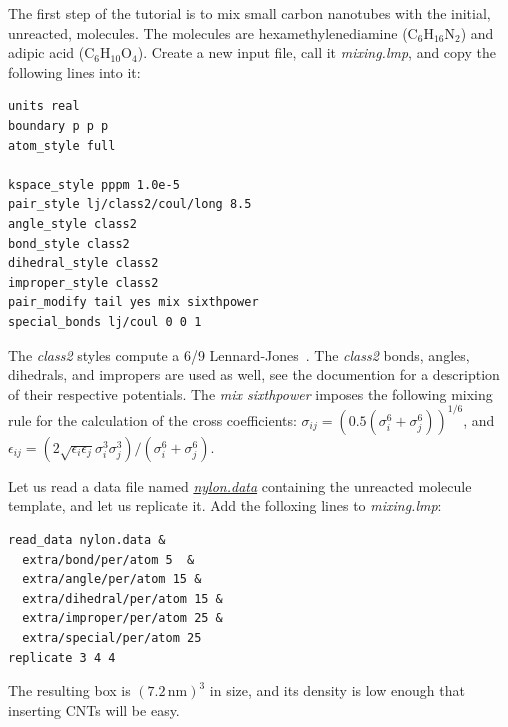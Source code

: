 \documentclass[9pt,tutorial]{livecoms}
\newcommand{\filepath}{https://raw.githubusercontent.com/lammpstutorials/lammpstutorials-article/main/files/}
\begin{document}
The first step of the tutorial is to mix small carbon nanotubes
with the initial, unreacted, molecules. The molecules are hexamethylenediamine
(C$_6$H$_{16}$N$_2$) and adipic acid (C$_6$H$_{10}$O$_4$). Create a new input
file, call it \textit{mixing.lmp}, and copy the following lines into it:
{\normalsize
\begin{verbatim}
units real
boundary p p p
atom_style full

kspace_style pppm 1.0e-5
pair_style lj/class2/coul/long 8.5
angle_style class2
bond_style class2
dihedral_style class2
improper_style class2
pair_modify tail yes mix sixthpower
special_bonds lj/coul 0 0 1
\end{verbatim}
}
The \textit{class2} styles compute a 6/9 Lennard-Jones~\cite{sun1998compass}.
The \textit{class2} bonds, angles, dihedrals, and impropers are used as
well, see the documention for a description of their respective potentials.
The \textit{mix sixthpower} imposes the following mixing rule for the calculation
of the cross coefficients: $\sigma_{ij} = ( 0.5 (\sigma^6_i+\sigma_j^6))^{1/6}$,
and $\epsilon_{ij} = (2 \sqrt{\epsilon_i \epsilon_j} \sigma^3_i \sigma^3_j)
/ (\sigma^6_i+\sigma_j^6)$.

Let us read a data file named \href{\filepath tutorial8/nylon.data}{\textit{nylon.data}}
containing the unreacted molecule template, and let us replicate it. Add the
folloxing lines to \textit{mixing.lmp}:
{\normalsize
\begin{verbatim}
read_data nylon.data &
  extra/bond/per/atom 5  &
  extra/angle/per/atom 15 &
  extra/dihedral/per/atom 15 &
  extra/improper/per/atom 25 &
  extra/special/per/atom 25
replicate 3 4 4
\end{verbatim}
}
The resulting box is $(7.2\,\text{nm})^3$ in size, and its density is low
enough that inserting CNTs will be easy.
\end{document}
